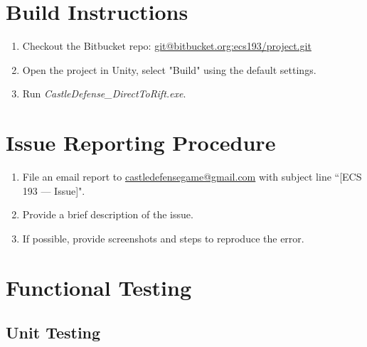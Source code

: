 \section{Build Instructions}

\begin{enumerate}
	\item Checkout the Bitbucket repo: \url{git@bitbucket.org:ecs193/project.git}
	\item Open the project in Unity, select "Build" using the default settings.
	\item Run \textit{CastleDefense\_DirectToRift.exe}.
\end{enumerate}

\section{Issue Reporting Procedure}

\begin{enumerate}
	\item File an email report to \url{castledefensegame@gmail.com} with subject line ``[ECS 193 --- Issue]".
	\item Provide a brief description of the issue.
	\item If possible, provide screenshots and steps to reproduce the error.
\end{enumerate}

\section{Functional Testing}

\subsection{Unit Testing}

